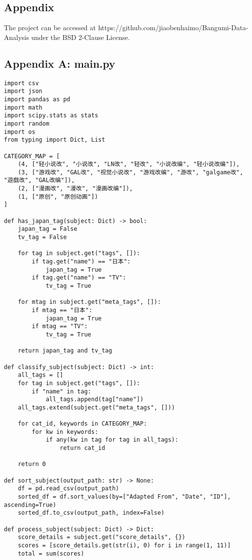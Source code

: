 \documentclass{article}
\begin{document}
\begin{CJK*}{UTF8}{gbsn}
\newpage
\section{Appendix}
The project can be accessed at https://github.com/jiaobenhaimo/Bangumi-Data-Analysis under the BSD 2-Clause License. 
\subsection{Appendix A: main.py}
\begin{CJK*}{UTF8}{gbsn}
\begin{verbatim}
import csv
import json
import pandas as pd
import math
import scipy.stats as stats
import random
import os
from typing import Dict, List

CATEGORY_MAP = [
    (4, ["轻小说改", "小说改", "LN改", "轻改", "小说改编", "轻小说改编"]),
    (3, ["游戏改", "GAL改", "视觉小说改", "游戏改编", "游改", "galgame改", "遊戲改", "GAL改编"]),
    (2, ["漫画改", "漫改", "漫画改编"]),
    (1, ["原创", "原创动画"])
]

def has_japan_tag(subject: Dict) -> bool:
    japan_tag = False
    tv_tag = False
    
    for tag in subject.get("tags", []):
        if tag.get("name") == "日本":
            japan_tag = True
        if tag.get("name") == "TV":
            tv_tag = True
    
    for mtag in subject.get("meta_tags", []):
        if mtag == "日本":
            japan_tag = True
        if mtag == "TV":
            tv_tag = True
        
    return japan_tag and tv_tag

def classify_subject(subject: Dict) -> int:
    all_tags = []
    for tag in subject.get("tags", []):
        if "name" in tag:
            all_tags.append(tag["name"])
    all_tags.extend(subject.get("meta_tags", []))
    
    for cat_id, keywords in CATEGORY_MAP:
        for kw in keywords:
            if any(kw in tag for tag in all_tags):
                return cat_id
    
    return 0

def sort_subject(output_path: str) -> None:
    df = pd.read_csv(output_path)
    sorted_df = df.sort_values(by=["Adapted From", "Date", "ID"], ascending=True)
    sorted_df.to_csv(output_path, index=False)

def process_subject(subject: Dict) -> Dict:
    score_details = subject.get("score_details", {})
    scores = [score_details.get(str(i), 0) for i in range(1, 11)]
    total = sum(scores)
    

\end{verbatim}
\end{CJK*}
\end{CJK*}
\end{document}
